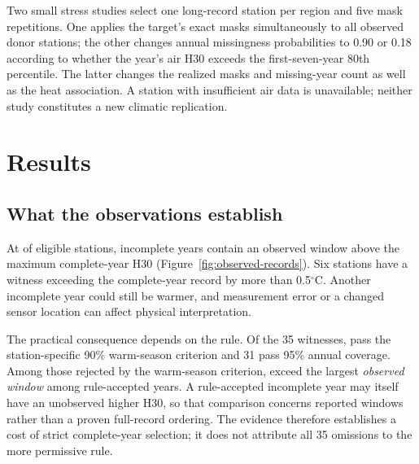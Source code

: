 \documentclass[draft,linenumbers]{agujournal2025}
\begin{document}


Two small stress studies select one long-record station per region and five mask repetitions. One applies the target's exact masks simultaneously to all observed donor stations; the other changes annual missingness probabilities to 0.90 or 0.18 according to whether the year's air H30 exceeds the first-seven-year 80th percentile. The latter changes the realized masks and missing-year count as well as the heat association. A station with insufficient air data is unavailable; neither study constitutes a new climatic replication.

\section{Results}
\subsection{What the observations establish}

At \RRecordStations{} of \RRecordDenominator{} eligible stations, \RRecordStationYears{} incomplete years contain an observed window above the maximum complete-year H30 (Figure~\ref{fig:observed-records}). Six stations have a witness exceeding the complete-year record by more than 0.5$^{\circ}$C. Another incomplete year could still be warmer, and measurement error or a changed sensor location can affect physical interpretation.

The practical consequence depends on the rule. Of the 35 witnesses, \WAWarmAdmitted{} pass the station-specific 90\% warm-season criterion and 31 pass 95\% annual coverage. Among those rejected by the warm-season criterion, \WAWarmExcludedExceed{} exceed the largest \emph{observed window} among rule-accepted years. A rule-accepted incomplete year may itself have an unobserved higher H30, so that comparison concerns reported windows rather than a proven full-record ordering. The evidence therefore establishes a cost of strict complete-year selection; it does not attribute all 35 omissions to the more permissive rule.
\end{document}
